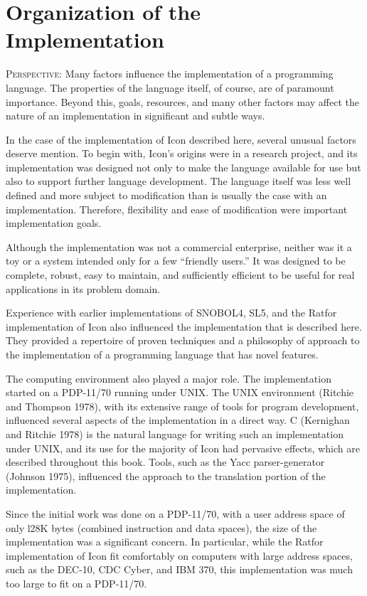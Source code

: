 \chapter{Organization of the Implementation}

\textsc{Perspective}: Many factors influence the implementation of a
programming language. The properties of the language itself, of
course, are of paramount importance. Beyond this, goals, resources,
and many other factors may affect the nature of an implementation in
significant and subtle ways.

In the case of the implementation of Icon described here, several
unusual factors deserve mention. To begin with, Icon's origins were in
a research project, and its implementation was designed not only to
make the language available for use but also to support further
language development. The language itself was less well defined and
more subject to modification than is usually the case with an
implementation. Therefore, flexibility and ease of modification were
important implementation goals.

Although the implementation was not a commercial enterprise, neither
was it a toy or a system intended only for a few ``friendly users.''
It was designed to be complete, robust, easy to maintain, and
sufficiently efficient to be useful for real applications in its
problem domain.

Experience with earlier implementations of SNOBOL4, SL5, and the
Ratfor implementation of Icon also influenced the implementation that
is described here. They provided a repertoire of proven techniques and
a philosophy of approach to the implementation of a programming
language that has novel features.

The computing environment also played a major role. The implementation
started on a PDP-11/70 running under UNIX. The UNIX environment
(Ritchie and Thompson 1978), with its extensive range of tools for
program development, influenced several aspects of the implementation
in a direct way. C (Kernighan and Ritchie 1978) is the natural
language for writing such an implementation under UNIX, and its use
for the majority of Icon had pervasive effects, which are described
throughout this book. Tools, such as the Yacc parser-generator
(Johnson 1975), influenced the approach to the translation portion of
the implementation.

Since the initial work was done on a PDP-11/70, with a user address
space of only l28K bytes (combined instruction and data spaces), the
size of the implementation was a significant concern. In particular,
while the Ratfor implementation of Icon fit comfortably on computers
with large address spaces, such as the DEC-10, CDC Cyber, and IBM 370,
this implementation was much too large to fit on a PDP-11/70.

